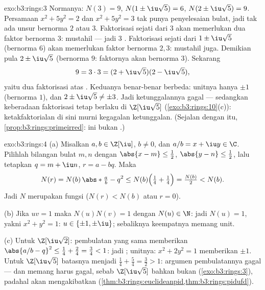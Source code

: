 \begin{solution}{exo:b3:rings:3}
Normanya: $N(3) = 9$, $N(1 \pm \iu\sqrt5) = 6$, $N(2 \pm \iu\sqrt5) =
9$. Persamaan $x^2 + 5y^2 = 2$ dan $x^2 + 5y^2 = 3$ tak punya
penyelesaian bulat, jadi tak ada unsur bernorma $2$ atau $3$. Faktorisasi sejati
dari $3$ akan memerlukan dua faktor bernorma $3$:
mustahil --- jadi $3$ . Faktorisasi sejati dari $1
\pm \iu\sqrt5$ (bernorma $6$) akan memerlukan faktor bernorma $2, 3$:
mustahil juga. Demikian pula $2 \pm \iu\sqrt5$ (bernorma $9$: faktornya akan
bernorma $3$). Sekarang
\[
9 = 3 \cdot 3 = (2 + \iu\sqrt5)(2 - \iu\sqrt5),
\]
yaitu dua faktorisasi atas . Keduanya benar-benar
berbeda: unitnya hanya $\pm 1$ (bernorma $1$), dan $2 \pm \iu\sqrt5
\neq \pm 3$. Jadi ketunggalannya gagal --- sedangkan keberadaan
faktorisasi tetap berlaku di $\Z[\iu\sqrt5]$
(\cref{exo:b3:rings:10}(c)): ketakfaktorialan di sini murni
kegagalan ketunggalan. (Sejalan dengan itu, \cref{prop:b3:rings:primeirred}:
 ini bukan .)
\end{solution}

\begin{solution}{exo:b3:rings:4}
(a) Misalkan $a, b \in \Z[\iu]$, $b \neq 0$, dan $a/b = x + \iu y \in
\C$. Pilihlah bilangan bulat $m, n$ dengan $\abs{x - m} \leq \frac12$,
$\abs{y - n} \leq \frac12$, lalu tetapkan $q = m + \iu n$, $r = a - bq$.
Maka
\[
N(r) = N(b)\,\abs*{\tfrac ab - q}^2
\leq N(b)\Bigl(\tfrac14 + \tfrac14\Bigr) = \tfrac{N(b)}2 < N(b).
\]
Jadi $N$ merupakan fungsi  ($N(r) < N(b)$ atau $r = 0$).

(b) Jika $uv = 1$ maka $N(u)N(v) = 1$ dengan $N(u) \in \N$: jadi $N(u) =
1$, yakni $x^2 + y^2 = 1$: $u \in \{\pm 1, \pm\iu\}$; sebaliknya
keempatnya memang unit.

(c) Untuk $\Z[\iu\sqrt2]$: pembulatan yang sama memberikan $\abs{a/b - q}^2
\leq \frac14 + \frac{2}4 = \frac34 < 1$: jadi ; unitnya: $x^2 +
2y^2 = 1$ memberikan $\pm 1$. Untuk $\Z[\iu\sqrt5]$ batasnya menjadi
$\frac14 + \frac54 = \frac32 > 1$: argumen pembulatannya gagal ---
dan memang harus gagal, sebab $\Z[\iu\sqrt5]$ bahkan bukan 
(\cref{exo:b3:rings:3}), padahal  akan mengakibatkan 
(\cref{thm:b3:rings:euclideanpid,thm:b3:rings:pidufd}).
\end{solution}

